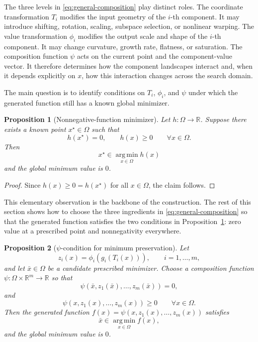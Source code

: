 \documentclass[11pt,a4paper]{article}
\theoremstyle{remark}
\theoremstyle{plain}
\newtheorem{proposition}{Proposition}
\begin{document}
The three levels in \eqref{eq:general-composition} play distinct roles. The
coordinate transformation $T_i$ modifies the input geometry of the $i$-th
component. It may introduce shifting, rotation, scaling, subspace selection,
or nonlinear warping. The value transformation $\phi_i$ modifies the output
scale and shape of the $i$-th component. It may change curvature, growth rate,
flatness, or saturation. The composition function $\psi$ acts on the current
point and the component-value vector. It therefore determines how the component
landscapes interact and, when it depends explicitly on \(x\), how this
interaction changes across the search domain.

The main question is to identify conditions on $T_i$, $\phi_i$, and $\psi$
under which the generated function still has a known global minimizer.




\begin{proposition}[Nonnegative-function minimizer]
	\label{f_helper}
	Let \(h:\Omega\to\mathbb{R}\). Suppose there exists a known point
	\(x^\star\in\Omega\) such that
	\[
	h(x^\star)=0, \qquad
	h(x)\ge0
	\qquad
	\forall x\in\Omega.
	\]
	Then
	\[
	x^\star\in\operatorname*{arg\,min}_{x\in\Omega} h(x)
	\]
	and the global minimum value is \(0\).
\end{proposition}

\begin{proof}
	Since \(h(x)\ge0=h(x^\star)\) for all \(x\in\Omega\), the claim follows.
\end{proof}

This elementary observation is the backbone of the construction. The rest of
this section shows how to choose the three ingredients in
\eqref{eq:general-composition} so that the generated function satisfies the two
conditions in Proposition~\ref{f_helper}: zero value at a prescribed point and
nonnegativity everywhere.

\begin{proposition}[\(\psi\)-condition for minimum preservation]
	\label{thm:general-minimum-preservation}
	Let
	\[
	z_i(x)
	=
	\phi_i(g_i(T_i(x))),
	\qquad i=1,\ldots,m,
	\]
	and let \(\bar x\in\Omega\) be a candidate prescribed minimizer. Choose a
	composition function \(\psi:\Omega\times\mathbb{R}^m\to\mathbb{R}\) so that
	\[
	\psi(\bar x,z_1(\bar x),\ldots,z_m(\bar x))=0,
	\]
	and
	\[
	\psi(x,z_1(x),\ldots,z_m(x))\ge0
	\qquad
	\forall x\in\Omega.
	\]
	Then the generated function \(f(x)=\psi(x,z_1(x),\ldots,z_m(x))\) satisfies
	\[
	\bar x\in\operatorname*{arg\,min}_{x\in\Omega} f(x),
	\]
	and the global minimum value is \(0\).
\end{proposition}
\end{document}

